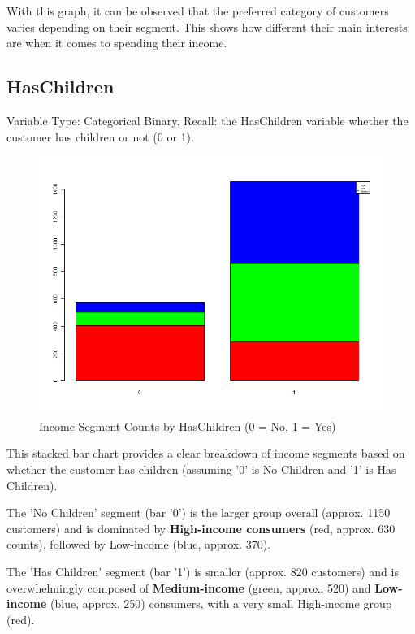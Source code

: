 With this graph, it can be observed that the preferred category of customers varies depending on their segment. This shows how different their main interests are when it comes to spending their income.

\newpage
\subsection{HasChildren}
Variable Type: Categorical Binary. 
Recall: the HasChildren variable whether the customer has children or not (0 or 1).

\begin{figure}[H]
    \centering
    \includegraphics[width= 1\linewidth]{Imatges/stacked_barplot_counts_IncomeSegment_10_legend.png}
    \caption{Income Segment Counts by HasChildren (0 = No, 1 = Yes)}
    \label{fig:scree_plot_8} %
\end{figure}

This stacked bar chart provides a clear breakdown of income segments based on whether the customer has children (assuming '0' is No Children and '1' is Has Children).

The 'No Children' segment (bar '0') is the larger group overall (approx. 1150 customers) and is dominated by \textbf{High-income consumers} (red, approx. 630 counts), followed by Low-income (blue, approx. 370).

The 'Has Children' segment (bar '1') is smaller (approx. 820 customers) and is overwhelmingly composed of \textbf{Medium-income} (green, approx. 520) and \textbf{Low-income} (blue, approx. 250) consumers, with a very small High-income group (red).

